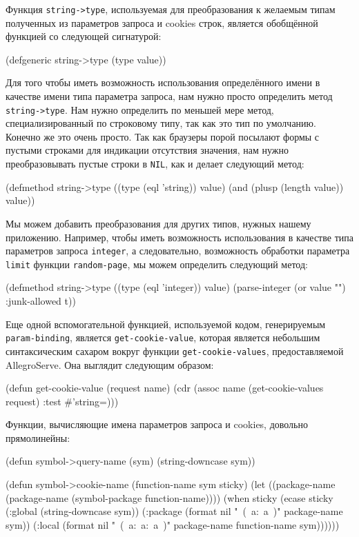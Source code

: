 Функция \lstinline!string->type!, используемая для преобразования к желаемым типам
полученных из параметров запроса и cookies строк, является обобщённой функцией со
следующей сигнатурой:

\begin{myverb}
(defgeneric string->type (type value))
\end{myverb}

Для того чтобы иметь возможность использования определённого имени в качестве имени типа
параметра запроса, нам нужно просто определить метод \lstinline!string->type!. Нам нужно
определить по меньшей мере метод, специализированный по строковому типу, так как это тип
по умолчанию. Конечно же это очень просто. Так как браузеры порой посылают формы с пустыми
строками для индикации отсутствия значения, нам нужно преобразовывать пустые строки в
\lstinline{NIL}, как и делает следующий метод:

\begin{myverb}
(defmethod string->type ((type (eql 'string)) value)
  (and (plusp (length value)) value))
\end{myverb}

Мы можем добавить преобразования для других типов, нужных нашему приложению. Например,
чтобы иметь возможность использования в качестве типа параметров запроса \lstinline{integer}, а
следовательно, возможность обработки параметра \lstinline{limit} функции \lstinline{random-page}, мы
можем определить следующий метод:

\begin{myverb}
(defmethod string->type ((type (eql 'integer)) value)
  (parse-integer (or value "") :junk-allowed t))
\end{myverb}

Еще одной вспомогательной функцией, используемой кодом, генерируемым \lstinline{param-binding},
является \lstinline{get-cookie-value}, которая является небольшим синтаксическим сахаром вокруг
функции \lstinline{get-cookie-values}, предоставляемой AllegroServe. Она выглядит следующим
образом:

\begin{myverb}
(defun get-cookie-value (request name)
  (cdr (assoc name (get-cookie-values request) :test #'string=)))
\end{myverb}

Функции, вычисляющие имена параметров запроса и cookies, довольно прямолинейны:

\begin{myverb}
(defun symbol->query-name (sym)
  (string-downcase sym))

(defun symbol->cookie-name (function-name sym sticky)
  (let ((package-name (package-name (symbol-package function-name))))
    (when sticky
      (ecase sticky
        (:global
         (string-downcase sym))
        (:package
         (format nil "~(~a:~a~)" package-name sym))
        (:local 
         (format nil "~(~a:~a:~a~)" package-name function-name sym))))))
\end{myverb}

